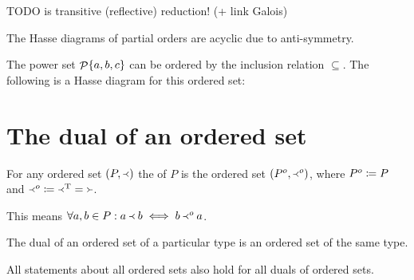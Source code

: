 TODO is transitive (reflective) reduction! (+ link Galois)

\begin{lemma}
The Hasse diagrams of partial orders are acyclic due to anti-symmetry.
\end{lemma}

\begin{example}
The power set $\mathop{\mathcal{P}}\{a,b,c\}$ can be ordered by the inclusion relation $\subseteq$. The following is a Hasse diagram for this ordered set:
\begin{center}
\end{center}
\end{example}

\section{The dual of an ordered set}
\begin{definition}
For any ordered set $(P, \Yleft)$ the  of $P$ is the ordered set $(P^o, \Yleft^o)$, where $P^o \coloneqq P$ and $\Yleft^o \coloneqq \Yleft^{\mathrm{T}} = \Yright$.
\end{definition}
This means $\forall a,b\in P: a\Yleft b \iff b\Yleft^o a$.

\begin{lemma}
The dual of an ordered set of a particular type is an ordered set of the same type.
\end{lemma}
\begin{corollary}
All statements about all ordered sets also hold for all duals of ordered sets.
\end{corollary}

